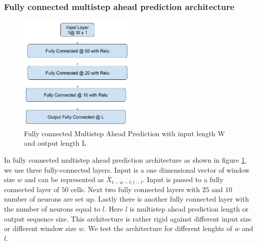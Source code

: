 \documentclass[12pt]{article}
\begin{document}
\subsubsection{Fully connected multistep ahead prediction architecture}
\begin{figure}[H]
\centering	
        \includegraphics[width=0.5\textwidth]{images/architecture/NnMultistepAheadPrediction.png}
    \caption{Fully connected Multistep Ahead Prediction with input length W and output length L}
    \label{NnMultiStep}
\end{figure}
In fully connected multistep ahead prediction architecture as shown in figure \ref{NnMultiStep}, we use three fully-connected layers. Input is a one dimensional vector of window size $w$ and can be represented as $X_{t-w-l:t-l}$. Input is passed to a fully connected layer of $50$ cells. Next two fully connected layers with $25$ and $10$ number of neurons are set up. Lastly there is another fully connected layer with the number of neurons equal to $l$. Here $l$ is multistep ahead prediction length or output sequence size. This architecture is rather rigid against different input size or different window size $w$. We test the architecture for different lenghts of $w$ and $l$.
\end{document}
